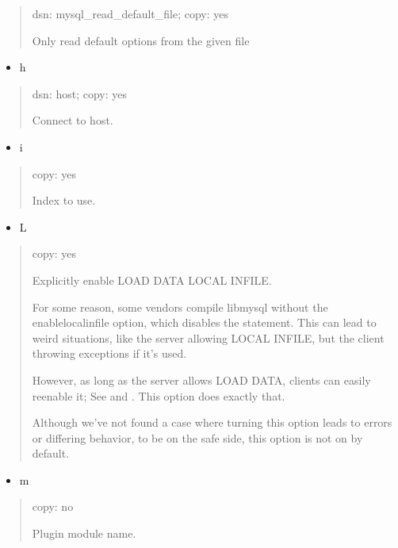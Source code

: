 \documentclass[letterpaper,10pt,english]{sphinxmanual}
\begin{document}
\begin{quote}

dsn: mysql\_read\_default\_file; copy: yes

Only read default options from the given file
\end{quote}
\begin{itemize}
\item {} 
h

\end{itemize}
\begin{quote}

dsn: host; copy: yes

Connect to host.
\end{quote}
\begin{itemize}
\item {} 
i

\end{itemize}
\begin{quote}

copy: yes

Index to use.
\end{quote}
\begin{itemize}
\item {} 
L

\end{itemize}
\begin{quote}

copy: yes

Explicitly enable LOAD DATA LOCAL INFILE.

For some reason, some vendors compile libmysql without the
\textendash{}enable\sphinxhyphen{}local\sphinxhyphen{}infile option, which disables the statement.  This can
lead to weird situations, like the server allowing LOCAL INFILE, but
the client throwing exceptions if it’s used.

However, as long as the server allows LOAD DATA, clients can easily
re\sphinxhyphen{}enable it; See 
and .
This option does exactly that.

Although we’ve not found a case where turning this option leads to errors or
differing behavior, to be on the safe side, this option is not
on by default.
\end{quote}
\begin{itemize}
\item {} 
m

\end{itemize}
\begin{quote}

copy: no

Plugin module name.
\end{quote}
\end{document}
